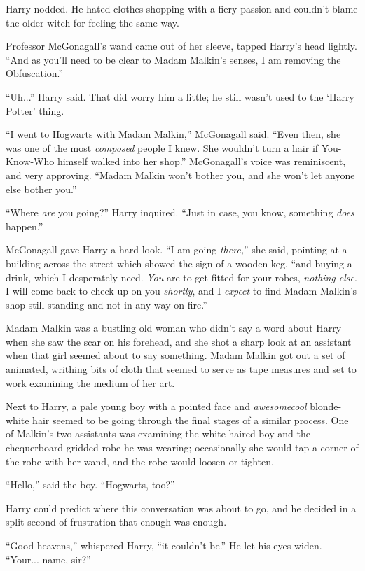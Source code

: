 Harry nodded. He hated clothes shopping with a fiery passion and couldn't blame the older witch for feeling the same way.

Professor McGonagall's wand came out of her sleeve, tapped Harry's head lightly. ``And as you'll need to be clear to Madam Malkin's senses, I am removing the Obfuscation.''

``Uh...'' Harry said. That did worry him a little; he still wasn't used to the `Harry Potter' thing.

``I went to Hogwarts with Madam Malkin,'' McGonagall said. ``Even then, she was one of the most \emph{composed} people I knew. She wouldn't turn a hair if You-Know-Who himself walked into her shop.'' McGonagall's voice was reminiscent, and very approving. ``Madam Malkin won't bother you, and she won't let anyone else bother you.''

``Where \emph{are} you going?'' Harry inquired. ``Just in case, you know, something \emph{does} happen.''

McGonagall gave Harry a hard look. ``I am going \emph{there,}'' she said, pointing at a building across the street which showed the sign of a wooden keg, ``and buying a drink, which I desperately need. \emph{You} are to get fitted for your robes, \emph{nothing else}. I will come back to check up on you \emph{shortly}, and I \emph{expect} to find Madam Malkin's shop still standing and not in any way on fire.''

Madam Malkin was a bustling old woman who didn't say a word about Harry when she saw the scar on his forehead, and she shot a sharp look at an assistant when that girl seemed about to say something. Madam Malkin got out a set of animated, writhing bits of cloth that seemed to serve as tape measures and set to work examining the medium of her art.

Next to Harry, a pale young boy with a pointed face and \emph{awesomecool} blonde-white hair seemed to be going through the final stages of a similar process. One of Malkin's two assistants was examining the white-haired boy and the chequerboard-gridded robe he was wearing; occasionally she would tap a corner of the robe with her wand, and the robe would loosen or tighten.

``Hello,'' said the boy. ``Hogwarts, too?''

Harry could predict where this conversation was about to go, and he decided in a split second of frustration that enough was enough.

``Good heavens,'' whispered Harry, ``it couldn't be.'' He let his eyes widen. ``Your... name, sir?''

